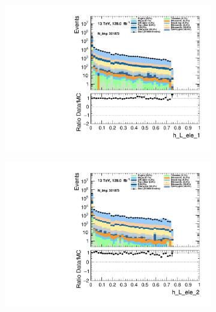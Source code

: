 \begin{figure}
\begin{subfigure}{.49\textwidth}
        \includegraphics[width=\textwidth]{Figures/MC_Data_comp/h_L_ele_1.pdf}
        \caption{ }
        \label{fig:fep}
    \end{subfigure}
    \hfill
    \begin{subfigure}{.49\textwidth}
        \includegraphics[width=\textwidth]{Figures/MC_Data_comp/h_L_ele_2.pdf}
        \caption{ }
        \label{fig:fe}
    \end{subfigure}
    \hfill       
    \caption{}
    \label{fig:t}
\end{figure}

